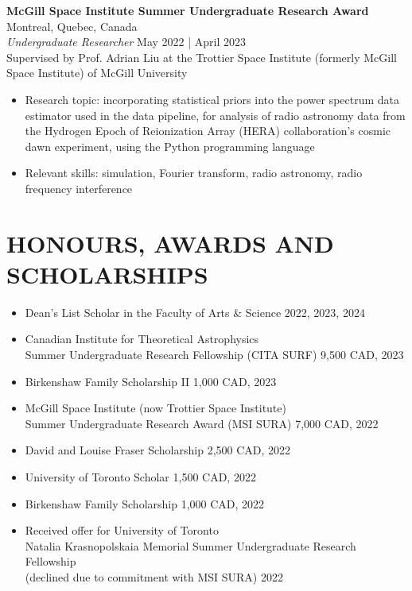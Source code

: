 \documentclass[a4paper,10pt]{extarticle}
\begin{document}
 
\textbf{McGill Space Institute Summer Undergraduate Research Award} \hfill Montreal, Quebec, Canada\\
\textit{Undergraduate Researcher} \hfill May 2022 | April 2023\\
Supervised by Prof. Adrian Liu at the Trottier Space Institute (formerly McGill Space Institute) of McGill University
\begin{itemize}
    \item Research topic: incorporating statistical priors into the power spectrum data estimator used in the data pipeline, for analysis of radio astronomy data from the Hydrogen Epoch of Reionization Array (HERA) collaboration's cosmic dawn experiment, using the Python programming language

    \item Relevant skills: simulation, Fourier transform, radio astronomy, radio frequency interference
\end{itemize}


\newpage
\section*{HONOURS, AWARDS AND SCHOLARSHIPS}
\begin{itemize}
    \item Dean's List Scholar in the Faculty of Arts \& Science \hfill 2022, 2023, 2024

    \item Canadian Institute for Theoretical Astrophysics \\
    Summer Undergraduate Research Fellowship (CITA SURF) \hfill 9,500 CAD, 2023
    
    \item Birkenshaw Family Scholarship II \hfill 1,000 CAD, 2023

    \item McGill Space Institute (now Trottier Space Institute) \\Summer Undergraduate Research Award (MSI SURA) \hfill 7,000 CAD, 2022

    \item David and Louise Fraser Scholarship \hfill 2,500 CAD, 2022

    \item University of Toronto Scholar \hfill 1,500 CAD, 2022

    \item Birkenshaw Family Scholarship \hfill 1,000 CAD, 2022

    \item Received offer for University of Toronto \\Natalia Krasnopolskaia Memorial Summer Undergraduate Research Fellowship \\(declined due to commitment with MSI SURA) \hfill 2022
\end{itemize}
\end{document}
